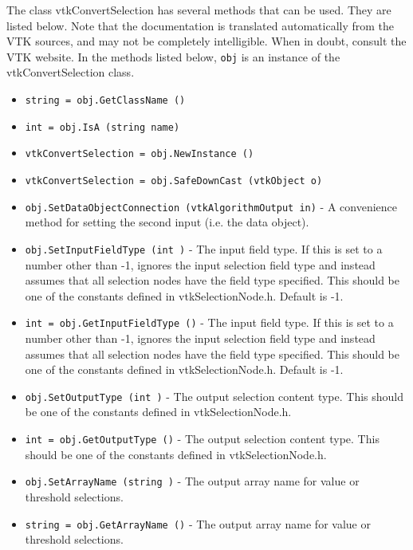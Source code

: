 The class vtkConvertSelection has several methods that can be used.
  They are listed below.
Note that the documentation is translated automatically from the VTK sources,
and may not be completely intelligible.  When in doubt, consult the VTK website.
In the methods listed below, \verb|obj| is an instance of the vtkConvertSelection class.
\begin{itemize}
\item  \verb|string = obj.GetClassName ()|

\item  \verb|int = obj.IsA (string name)|

\item  \verb|vtkConvertSelection = obj.NewInstance ()|

\item  \verb|vtkConvertSelection = obj.SafeDownCast (vtkObject o)|

\item  \verb|obj.SetDataObjectConnection (vtkAlgorithmOutput in)| -  A convenience method for setting the second input (i.e. the data object).

\item  \verb|obj.SetInputFieldType (int )| -  The input field type.
 If this is set to a number other than -1, ignores the input selection
 field type and instead assumes that all selection nodes have the
 field type specified.
 This should be one of the constants defined in vtkSelectionNode.h.
 Default is -1.

\item  \verb|int = obj.GetInputFieldType ()| -  The input field type.
 If this is set to a number other than -1, ignores the input selection
 field type and instead assumes that all selection nodes have the
 field type specified.
 This should be one of the constants defined in vtkSelectionNode.h.
 Default is -1.

\item  \verb|obj.SetOutputType (int )| -  The output selection content type.
 This should be one of the constants defined in vtkSelectionNode.h.

\item  \verb|int = obj.GetOutputType ()| -  The output selection content type.
 This should be one of the constants defined in vtkSelectionNode.h.

\item  \verb|obj.SetArrayName (string )| -  The output array name for value or threshold selections.

\item  \verb|string = obj.GetArrayName ()| -  The output array name for value or threshold selections.


\end{itemize}
